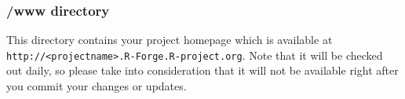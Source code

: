 \documentclass[a4paper]{article}
\begin{document}
\subsubsection{/www directory}
This directory contains your project homepage which is available at
\texttt{http://<projectname>.R-Forge.R-project.org}.
Note that it will be checked out daily, so please take
into consideration that it will not be available right after you
commit your changes or updates. 





\end{document}
